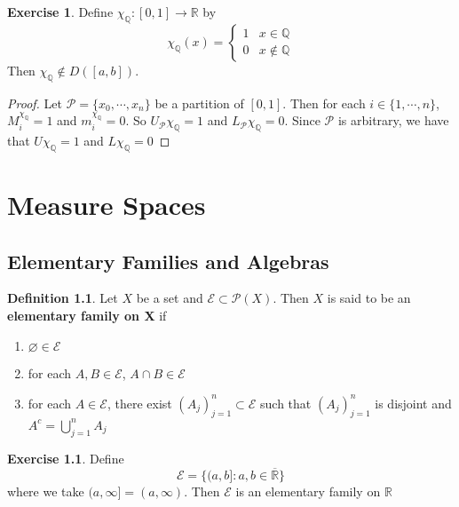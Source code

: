 \documentclass{book}
\theoremstyle{definition}
\newtheorem{defn}[definition]{Definition}
\newtheorem{ex}[definition]{Exercise}
\newcommand{\Q}{\mathbb{Q}}
\newcommand{\R}{\mathbb{R}}
\newcommand{\ME}{\mathcal{E}}
\newcommand{\MP}{\mathcal{P}}
\newcommand{\lex}[1]{\label{ex:#1}}
\newcommand{\ld}[1]{\label{defn:#1}}
\DeclareMathOperator*{\0}{\mbf{0}}
\DeclareMathOperator*{\1}{\mbf{1}}
\begin{document}
	\begin{ex} \lex{00000} 
		Define $\chi_{\Q}:[0,1] \rightarrow \R$ by $$\chi_{\Q}(x) = \begin{cases}
			1 & x \in \Q \\
			0 & x \not \in \Q
		\end{cases}$$
		Then $\chi_\Q \not \in D([a,b])$.
	\end{ex}

	\begin{proof}
		Let $\MP = \{x_0, \cdots, x_n\}$ be a partition of $[0,1]$. Then for each $i \in \{1, \cdots, n\}$, $M^{\chi_{\Q}}_i = 1$ and $m^{\chi_{\Q}}_i = 0$. So $U_\MP \chi_\Q = 1$ and $L_\MP \chi_\Q = 0$. Since $\MP$ is arbitrary, we have that $U \chi_\Q = 1$ and $L \chi_\Q = 0$
	\end{proof}

	
	
	
	
	
	
	
	
	
	
	
	
	
	
	\newpage
	
	\chapter{Measure Spaces}
	
	
	\section{Elementary Families and Algebras}
	
	\begin{defn} \ld{00000} 
		Let $X$ be a set and $\ME \subset \MP(X)$. Then $X$ is said to be an \textbf{elementary family on X} if 
		\begin{enumerate}
			\item $\varnothing \in \ME$
			\item for each $A, B \in \ME$, $A \cap B \in \ME$
			\item for each $A \in \ME$, there exist $(A_j)_{j=1}^n \subset \ME$ such that  $(A_j)_{j=1}^n $ is disjoint and $A^c = \bigcup\limits_{j=1}^n A_j$
		\end{enumerate}
	\end{defn}
	
	\begin{ex} \lex{00000} 
		Define $$\ME = \{(a,b]: a,b \in \overline{\R}\}$$ where we take $(a, \infty] = (a, \infty)$. Then $\ME$ is an elementary family on $\R$
	\end{ex}
	
\end{document}
